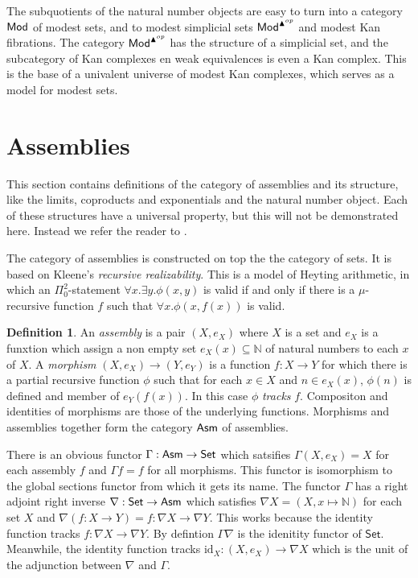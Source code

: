 \documentclass{amsart}
\theoremstyle{plain}
\theoremstyle{definition}
\newtheorem{defin}[theorem]{Definition}
\newcommand\hide[1]{}
\newcommand\id{\mathrm{id}}
\begin{document}
The subquotients of the natural number objects are easy to turn into a category $\mathsf{Mod}$ of modest sets, and to modest simplicial sets $\mathsf{Mod}^{\blacktriangle^{op}}$ and modest Kan fibrations. The category $\mathsf{Mod}^{\blacktriangle^{op}}$ has the structure of a simplicial set, and the subcategory of Kan complexes en weak equivalences is even a Kan complex. This is the base of a univalent universe of modest Kan complexes, which serves as a model for modest sets.

\section{Assemblies}
This section contains definitions of the category of assemblies and its structure, like the limits, coproducts and exponentials and the natural number object. Each of these structures have a universal property, but this will not be demonstrated here. Instead we refer the reader to \hide{cite: Jaap, eigen artikelen}.

The category of assemblies is constructed on top the the category of sets. It is based on Kleene's \emph{recursive realizability}. This is a model of Heyting arithmetic, in which an $\Pi^2_0$-statement $\forall x.\exists y.\phi(x,y)$ is valid if and only if there is a $\mu$-recursive function\hide{see wikipedia} $f$ such that $\forall x. \phi(x,f(x))$ is valid.

\newcommand\N{\mathbb N}
\newcommand\Set{\mathsf{Set}}
\begin{defin} An \emph{assembly} is a pair $(X,e_X)$ where $X$ is a set and $e_X$ is a funxtion which assign a non empty set $e_X(x)\subseteq \N$ of natural numbers to each $x$ of $X$. A \emph{morphism} $(X,e_X)\to (Y,e_Y)$ is a function $f:X\to Y$ for which there is a partial recursive function $\phi$ such that for each $x\in X$ and $n\in e_X(x)$, $\phi(n)$ is defined and member of $e_Y(f(x))$. In this case $\phi$ \emph{tracks} $f$. Compositon and identities of morphisms are those of the underlying functions. Morphisms and assemblies together form the category $\mathsf{Asm}$ of assemblies.
\end{defin}

There is an obvious functor $\Gamma:\asm\to\Set$ which satsifies $\Gamma(X,e_X)=X$ for each assembly $f$ and $\Gamma f = f$ for all morphisms. This functor is isomorphism to the global sections functor from which it gets its name. The functor $\Gamma$ has a right adjoint right inverse $\nabla:\Set\to\asm$ which satisfies $\nabla X = (X,x\mapsto\N)$ for each set $X$ and $\nabla (f:X\to Y) = f:\nabla X\to\nabla Y$. This works because the identity function tracks $f:\nabla X\to\nabla Y$. By defintion $\Gamma\nabla$ is the idenitity functor of $\Set$. Meanwhile, the identity function tracks $\id_X:(X,e_X) \to \nabla X$ which is the unit of the adjunction between $\nabla$ and $\Gamma$.
\end{document}
